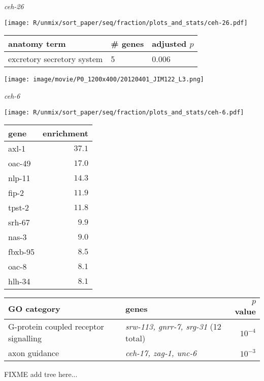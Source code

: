 \documentclass[serif,9pt]{beamer}
\begin{document}
\begin{frame}{{\em ceh-26}}

\begin{minipage}{0.4\textwidth}
\texttt{[image: R/unmix/sort\_paper/seq/fraction/plots\_and\_stats/ceh-26.pdf]}
\end{minipage}
\begin{minipage}{0.58\textwidth}
\begin{table}[!tbp]\scriptsize
\begin{tabular}{lll}
anatomy term & \# genes & adjusted $p$ \\
\hline
excretory secretory system & 5 & 0.006 
\end{tabular}
\end{table}
\end{minipage}

\texttt{[image: image/movie/P0\_1200x400/20120401\_JIM122\_L3.png]}

\end{frame}

\begin{frame}{{\em ceh-6}}

\begin{minipage}{0.4\textwidth}
\texttt{[image: R/unmix/sort\_paper/seq/fraction/plots\_and\_stats/ceh-6.pdf]}
\end{minipage}
\begin{minipage}{0.58\textwidth}
\begin{table}[!tbp]\footnotesize
\begin{tabular}{lr}
\multicolumn{1}{l}{gene}&\multicolumn{1}{c}{enrichment}\tabularnewline
\hline
axl-1&$37.1$\tabularnewline
oac-49&$17.0$\tabularnewline
nlp-11&$14.3$\tabularnewline
fip-2&$11.9$\tabularnewline
tpst-2&$11.8$\tabularnewline
srh-67&$ 9.9$\tabularnewline
nas-3&$ 9.0$\tabularnewline
fbxb-95&$ 8.5$\tabularnewline
oac-8&$ 8.1$\tabularnewline
hlh-34&$ 8.1$\tabularnewline
\hline
\end{tabular}
\end{table}

\end{minipage}

\begin{table}\footnotesize
\begin{tabular}{llr}
GO category & genes & $p$ value \\
\hline
G-protein coupled receptor signalling & {\em srw-113, gnrr-7, srg-31} (12 total) & $10^{-4}$ \\
axon guidance & {\em ceh-17, zag-1, unc-6} & $10^{-3}$ \\
\end{tabular}
\end{table}

FIXME add tree here...
\end{frame}
\end{document}
